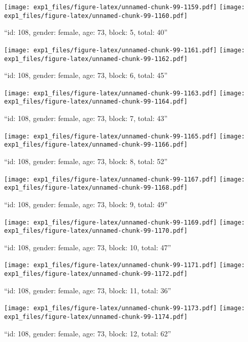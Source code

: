 \documentclass[,]{article}
\begin{document}
\texttt{[image: exp1\_files/figure-latex/unnamed-chunk-99-1159.pdf]}
\texttt{[image: exp1\_files/figure-latex/unnamed-chunk-99-1160.pdf]}

\newpage
[1] 

``id: 108, gender: female, age: 73, block: 5, total: 40''

\texttt{[image: exp1\_files/figure-latex/unnamed-chunk-99-1161.pdf]}
\texttt{[image: exp1\_files/figure-latex/unnamed-chunk-99-1162.pdf]}

\newpage
[1] 

``id: 108, gender: female, age: 73, block: 6, total: 45''

\texttt{[image: exp1\_files/figure-latex/unnamed-chunk-99-1163.pdf]}
\texttt{[image: exp1\_files/figure-latex/unnamed-chunk-99-1164.pdf]}

\newpage
[1] 

``id: 108, gender: female, age: 73, block: 7, total: 43''

\texttt{[image: exp1\_files/figure-latex/unnamed-chunk-99-1165.pdf]}
\texttt{[image: exp1\_files/figure-latex/unnamed-chunk-99-1166.pdf]}

\newpage
[1] 

``id: 108, gender: female, age: 73, block: 8, total: 52''

\texttt{[image: exp1\_files/figure-latex/unnamed-chunk-99-1167.pdf]}
\texttt{[image: exp1\_files/figure-latex/unnamed-chunk-99-1168.pdf]}

\newpage
[1] 

``id: 108, gender: female, age: 73, block: 9, total: 49''

\texttt{[image: exp1\_files/figure-latex/unnamed-chunk-99-1169.pdf]}
\texttt{[image: exp1\_files/figure-latex/unnamed-chunk-99-1170.pdf]}

\newpage
[1] 

``id: 108, gender: female, age: 73, block: 10, total: 47''

\texttt{[image: exp1\_files/figure-latex/unnamed-chunk-99-1171.pdf]}
\texttt{[image: exp1\_files/figure-latex/unnamed-chunk-99-1172.pdf]}

\newpage
[1] 

``id: 108, gender: female, age: 73, block: 11, total: 36''

\texttt{[image: exp1\_files/figure-latex/unnamed-chunk-99-1173.pdf]}
\texttt{[image: exp1\_files/figure-latex/unnamed-chunk-99-1174.pdf]}

\newpage
[1] 

``id: 108, gender: female, age: 73, block: 12, total: 62''
\end{document}
